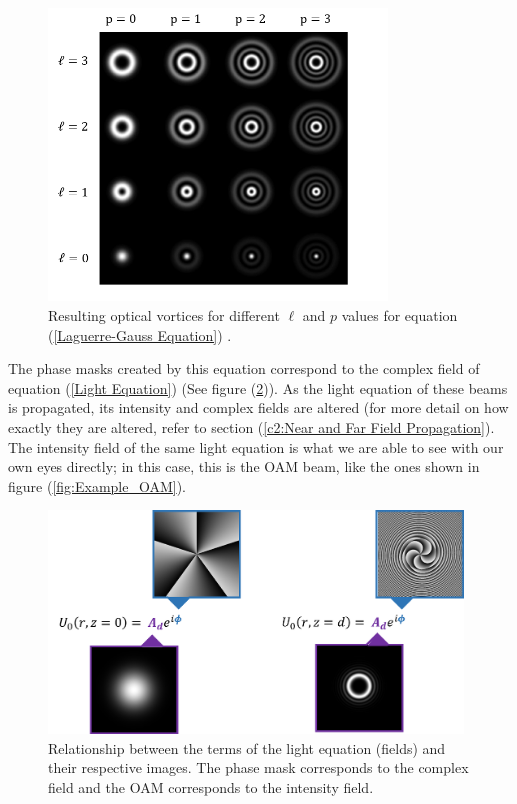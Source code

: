 \begin{figure}[htbp]
    \centering
    \includegraphics[width=9cm]{images/c02/OAM/OAM_given_L_and_P.png}
    \caption{Resulting optical vortices for different $\ell$ and $p$ values for equation (\ref{Laguerre-Gauss Equation}) \protect\cite{OAM_states_Carbone:2013}.}
    \label{fig:OAMs_given_L_and_P}
\end{figure}

\newpage
The phase masks created by this equation correspond to the complex field of equation (\ref{Light Equation}) (See figure (\ref{fig:lighteq_to_images})). As the light equation of these beams is propagated, its intensity and complex fields are altered (for more detail on how exactly they are altered, refer to section (\ref{c2:Near and Far Field Propagation}). The intensity field of the same light equation is what we are able to see with our own eyes directly; in this case, this is the OAM beam, like the ones shown in figure (\ref{fig:Example_OAM}).

\begin{figure}[htbp]
    \centering
    \includegraphics[width=11cm]{images/c02/OAM/Light_Equation_Images.png}
    \caption{Relationship between the terms of the light equation (fields) and their respective images. The phase mask corresponds to the complex field and the OAM corresponds to the intensity field.}
    \label{fig:lighteq_to_images}
\end{figure}

